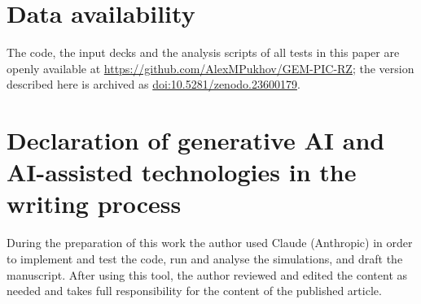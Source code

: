 \documentclass[preprint,12pt]{elsarticle}
\begin{document}
\section*{Data availability}
The code, the input decks and the analysis scripts of all tests in this paper are openly available at \url{https://github.com/AlexMPukhov/GEM-PIC-RZ}; the version described here is archived as \href{https://doi.org/10.5281/zenodo.23600179}{doi:10.5281/zenodo.23600179}.

\section*{Declaration of generative AI and AI-assisted technologies in the writing process}
During the preparation of this work the author used Claude (Anthropic) in order to implement and test the code, run and analyse the simulations, and draft the manuscript. After using this tool, the author reviewed and edited the content as needed and takes full responsibility for the content of the published article.
\end{document}
